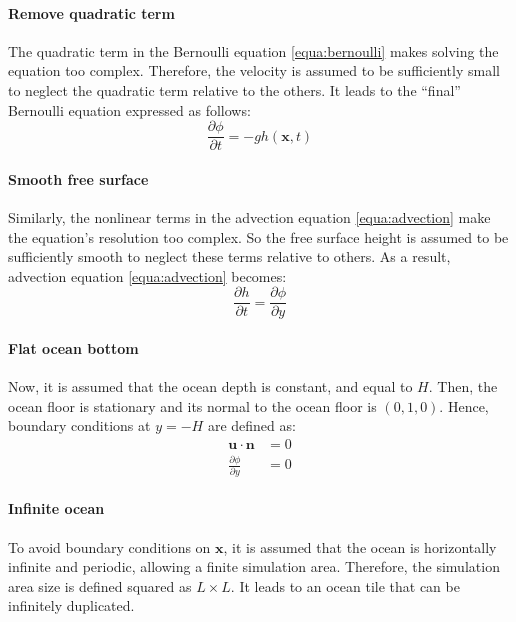 \documentclass[final]{jcgt}
\begin{document}
\paragraph{Remove quadratic term}
The quadratic term in the Bernoulli equation \ref{equa:bernoulli} makes solving the equation too complex.
Therefore, the velocity is assumed to be sufficiently small to neglect the quadratic term relative to the others.
It leads to the “final” Bernoulli equation expressed as follows:
\begin{equation}
	\frac{\partial \phi}{\partial t} = -gh(\mathbf x,t) \label{equa:bernoulliS}
\end{equation}

\paragraph{Smooth free surface}
Similarly, the nonlinear terms in the advection equation \ref{equa:advection} make the equation's resolution too complex.
So the free surface height is assumed to be sufficiently smooth to neglect these terms relative to others.
As a result, advection equation \ref{equa:advection} becomes:
\begin{equation}
	\frac{\partial h}{\partial t} = \frac{\partial \phi}{\partial y} \label{equa:advectionS}
\end{equation}

\paragraph{Flat ocean bottom}
Now, it is assumed that the ocean depth is constant, and equal to $H$.
Then, the ocean floor is stationary and its normal to the ocean floor is $(0,1,0)$.
Hence, boundary conditions at $y=-H$ are defined as:
\begin{equation}
	\begin{aligned}
		\mathbf{u}\cdot\mathbf{n}        & = 0 \\
		\frac{\partial \phi}{\partial y} & = 0
	\end{aligned}
	\label{equa:bottomCondition}
\end{equation}

\paragraph{Infinite ocean}
To avoid boundary conditions on $\mathbf x$, it is assumed that the ocean is horizontally infinite and periodic, allowing a finite simulation area.
Therefore, the simulation area size is defined squared as $L \times L$.
It leads to an ocean tile that can be infinitely duplicated.
\end{document}
